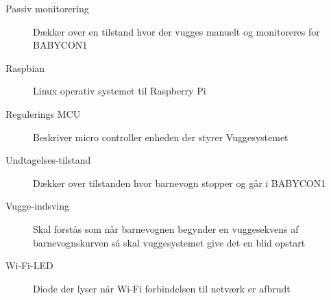 \begin{description}
\item[Passiv monitorering] Dækker over en tilstand hvor der vugges manuelt og monitoreres for BABYCON1
\item[Raspbian] Linux operativ systemet til Raspberry Pi 
\item[Regulerings MCU] Beskriver micro controller enheden der styrer Vuggesystemet
\item[Undtagelses-tilstand] Dækker over tilstanden hvor barnevogn stopper og går i BABYCON1
\item[Vugge-indsving] Skal forstås som når barnevognen begynder en vuggesekvens af barnevognskurven så skal vuggesystemet give det en blid opstart
\item[Wi-Fi-LED]Diode der lyser når Wi-Fi forbindelsen til netværk er afbrudt

\end{description}